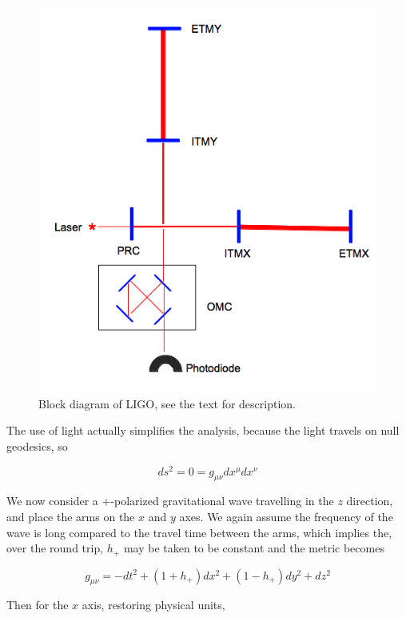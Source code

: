 \begin{figure}
  \includegraphics[width=\linewidth]{figures/theory/LIGO}
  \caption[Block diagram of LIGO]{
  \label{f:ligo}
Block diagram of LIGO, see the text for description.
}
\end{figure}%
The use of light actually simplifies the analysis, because the light
travels on null geodesics, so

\begin{equation*}
ds^2 = 0 = g_{\mu\nu} dx^\mu dx^\nu
\end{equation*}

We now consider a +-polarized gravitational wave travelling in the $z$
direction, and place the arms on the $x$ and $y$ axes.  We again
assume the frequency of the wave is long compared to the travel time
between the arms, which implies the, over the round trip, $h_+$ may be
taken to be constant and the metric becomes

\begin{equation*}
g_{\mu\nu} = -dt^2 + (1+h_+) dx^2 + (1-h_+) dy^2 + dz^2
\end{equation*}

Then for the $x$ axis, restoring physical units,

